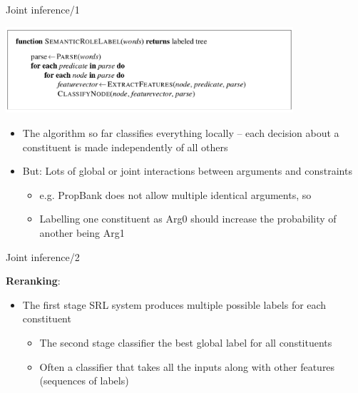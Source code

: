 \documentclass[10pt, compress]{beamer}
\begin{document}
\begin{frame}{Joint inference/1}

\begin{center}
\includegraphics[width=0.8\textwidth]{graphics/srl-parsing-algo.png}
\end{center}

\begin{itemize}
\item The algorithm so far classifies everything  locally  -- each decision  about a constituent is made independently of all others
\item But: Lots of  global or joint interactions between arguments and constraints
\begin{itemize}
  \item e.g. PropBank does    not    allow    multiple    identical   arguments, so
  \item Labelling one constituent as Arg0 should increase the probability of another being Arg1
\end{itemize}
\end{itemize}

\end{frame}

\begin{frame}{Joint inference/2}

\textbf{Reranking}:
\begin{itemize}
\item The first stage SRL system produces multiple possible labels for each constituent
\begin{itemize}
 \item The second stage classifier the best  global label for  all constituents
 \item Often a classifier that takes all the inputs along with other features (sequences of labels)
\end{itemize}
\end{itemize}

\end{frame}
\end{document}
